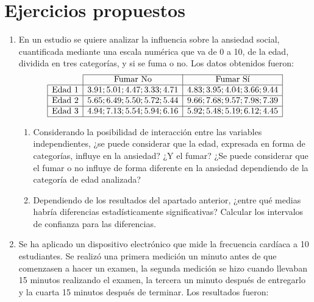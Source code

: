 \section{Ejercicios propuestos}
\begin{enumerate}[leftmargin=*]
\item En un estudio se quiere analizar la influencia sobre la ansiedad social, cuantificada mediante una escala numérica
que va de 0 a 10, de la edad, dividida en tres categorías, y si se fuma o no. 
Los datos obtenidos fueron:
\[
\begin{array}{|l|c|c|}
\cline{2-3}
\multicolumn{1}{c|}{} & \text{Fumar No} & \text{Fumar Sí} \\
\hline
\text{Edad 1} & 3.91; 5.01; 4.47; 3.33; 4.71 & 4.83; 3.95; 4.04; 3.66; 9.44 \\
\hline
\text{Edad 2} & 5.65; 6.49; 5.50; 5.72; 5.44 & 9.66; 7.68; 9.57; 7.98; 7.39 \\
\hline
\text{Edad 3} & 4.94; 7.13; 5.54;5.94; 6.16 & 5.92; 5.48; 5.19; 6.12; 4.45 \\
\hline
\end{array}
\]

\begin{enumerate}
\item Considerando la posibilidad de interacción entre las variables independientes, ¿se puede considerar que la edad,
expresada en forma de categorías, influye en la ansiedad? 
¿Y el fumar? 
¿Se puede considerar que el fumar o no influye de forma diferente en la ansiedad dependiendo de la categoría de edad
analizada?

\item Dependiendo de los resultados del apartado anterior, ¿entre qué medias habría diferencias estadísticamente
significativas? Calcular los intervalos de confianza para las diferencias.
\end{enumerate}


\item Se ha aplicado un dispositivo electrónico que mide la frecuencia cardíaca a 10 estudiantes.
Se realizó una primera medición un minuto antes de que comenzasen a hacer un examen, la segunda medición se hizo cuando
llevaban 15 minutos realizando el examen, la tercera un minuto después de entregarlo y la cuarta 15 minutos después de
terminar.
Los resultados fueron:


\end{enumerate}
